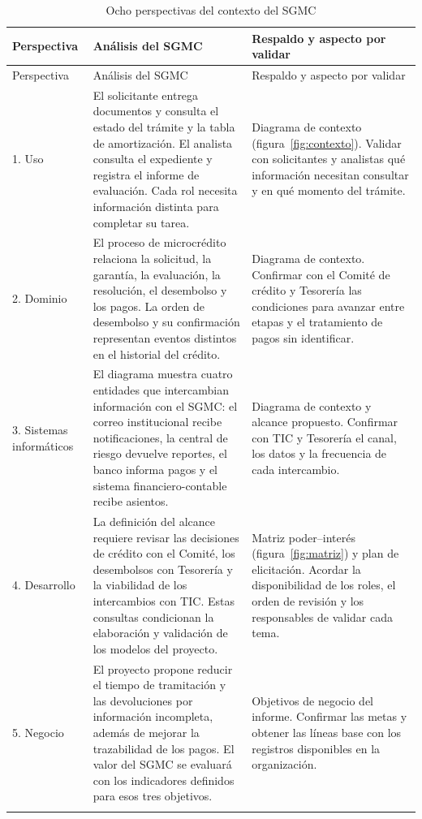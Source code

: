 \documentclass[11pt,a4paper]{article}
\begin{document}
\begingroup
\small
\setlength{\tabcolsep}{4pt}
\begin{longtable}{@{}L{.16}L{.40}L{.38}@{}}
\caption{Ocho perspectivas del contexto del SGMC}\label{tab:perspectivas}\\
\toprule
Perspectiva & Análisis del SGMC & Respaldo y aspecto por validar \\
\midrule
\endfirsthead
\toprule
Perspectiva & Análisis del SGMC & Respaldo y aspecto por validar \\
\midrule
\endhead
\bottomrule
\endfoot

1. Uso
& El solicitante entrega documentos y consulta el estado del trámite
y la tabla de amortización. El analista consulta el expediente y
registra el informe de evaluación. Cada rol necesita información
distinta para completar su tarea.
& Diagrama de contexto (figura~\ref{fig:contexto}). Validar con
solicitantes y analistas qué información necesitan consultar y en qué
momento del trámite. \\
\addlinespace

2. Dominio
& El proceso de microcrédito relaciona la solicitud, la garantía,
la evaluación, la resolución, el desembolso y los pagos. La orden de
desembolso y su confirmación representan eventos distintos en el
historial del crédito.
& Diagrama de contexto. Confirmar con el Comité de crédito y Tesorería
las condiciones para avanzar entre etapas y el tratamiento de pagos
sin identificar. \\
\addlinespace

3. Sistemas informáticos
& El diagrama muestra cuatro entidades que intercambian información
con el SGMC: el correo institucional recibe notificaciones, la central
de riesgo devuelve reportes, el banco informa pagos y el sistema
financiero-contable recibe asientos.
& Diagrama de contexto y alcance propuesto. Confirmar con TIC y
Tesorería el canal, los datos y la frecuencia de cada intercambio. \\
\addlinespace

4. Desarrollo
& La definición del alcance requiere revisar las decisiones de
crédito con el Comité, los desembolsos con Tesorería y la viabilidad
de los intercambios con TIC. Estas consultas condicionan la elaboración
y validación de los modelos del proyecto.
& Matriz poder--interés (figura~\ref{fig:matriz}) y plan de
elicitación. Acordar la disponibilidad de los roles, el orden de
revisión y los responsables de validar cada tema. \\
\addlinespace

5. Negocio
& El proyecto propone reducir el tiempo de tramitación y las
devoluciones por información incompleta, además de mejorar la
trazabilidad de los pagos. El valor del SGMC se evaluará con los
indicadores definidos para esos tres objetivos.
& Objetivos de negocio del informe. Confirmar las metas y obtener
las líneas base con los registros disponibles en la organización. \\
\addlinespace


\end{longtable}
\end{document}
